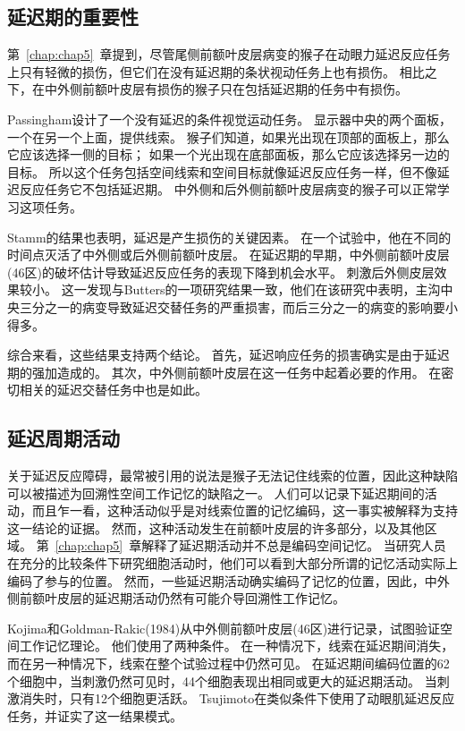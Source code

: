 \subsection{延迟期的重要性}

第~\ref{chap:chap5}~章提到，尽管尾侧前额叶皮层病变的猴子在动眼力延迟反应任务上只有轻微的损伤，但它们在没有延迟期的条状视动任务上也有损伤。
相比之下，在中外侧前额叶皮层有损伤的猴子只在包括延迟期的任务中有损伤。


Passingham\cite{passingham1985memory}设计了一个没有延迟的条件视觉运动任务。
显示器中央的两个面板，一个在另一个上面，提供线索。
猴子们知道，如果光出现在顶部的面板上，那么它应该选择一侧的目标；
如果一个光出现在底部面板，那么它应该选择另一边的目标。
所以这个任务包括空间线索和空间目标就像延迟反应任务一样，但不像延迟反应任务它不包括延迟期。
中外侧和后外侧前额叶皮层病变的猴子可以正常学习这项任务。


Stamm\cite{stamm1969electrical}的结果也表明，延迟是产生损伤的关键因素。
在一个试验中，他在不同的时间点灭活了中外侧或后外侧前额叶皮层。
在延迟期的早期，中外侧前额叶皮层(46区)的破坏估计导致延迟反应任务的表现下降到机会水平。
刺激后外侧皮层效果较小。
这一发现与Butters\cite{butters1969retention}的一项研究结果一致，他们在该研究中表明，主沟中央三分之一的病变导致延迟交替任务的严重损害，而后三分之一的病变的影响要小得多。


综合来看，这些结果支持两个结论。
首先，延迟响应任务的损害确实是由于延迟期的强加造成的。
其次，中外侧前额叶皮层在这一任务中起着必要的作用。
在密切相关的延迟交替任务中也是如此。



\subsection{延迟周期活动}

关于延迟反应障碍，最常被引用的说法是猴子无法记住线索的位置，因此这种缺陷可以被描述为回溯性空间工作记忆的缺陷之一。
人们可以记录下延迟期间的活动，而且乍一看，这种活动似乎是对线索位置的记忆编码，这一事实被解释为支持这一结论的证据。
然而，这种活动发生在前额叶皮层的许多部分，以及其他区域。
第~\ref{chap:chap5}~章解释了延迟期活动并不总是编码空间记忆。
当研究人员在充分的比较条件下研究细胞活动时，他们可以看到大部分所谓的记忆活动实际上编码了参与的位置。
然而，一些延迟期活动确实编码了记忆的位置，因此，中外侧前额叶皮层的延迟期活动仍然有可能介导回溯性工作记忆。


Kojima和Goldman-Rakic(1984)从中外侧前额叶皮层(46区)进行记录，试图验证空间工作记忆理论。
他们使用了两种条件。
在一种情况下，线索在延迟期间消失，而在另一种情况下，线索在整个试验过程中仍然可见。
在延迟期间编码位置的62个细胞中，当刺激仍然可见时，44个细胞表现出相同或更大的延迟期活动。
当刺激消失时，只有12个细胞更活跃。
Tsujimoto\cite{tsujimoto2004properties}在类似条件下使用了动眼肌延迟反应任务，并证实了这一结果模式。


